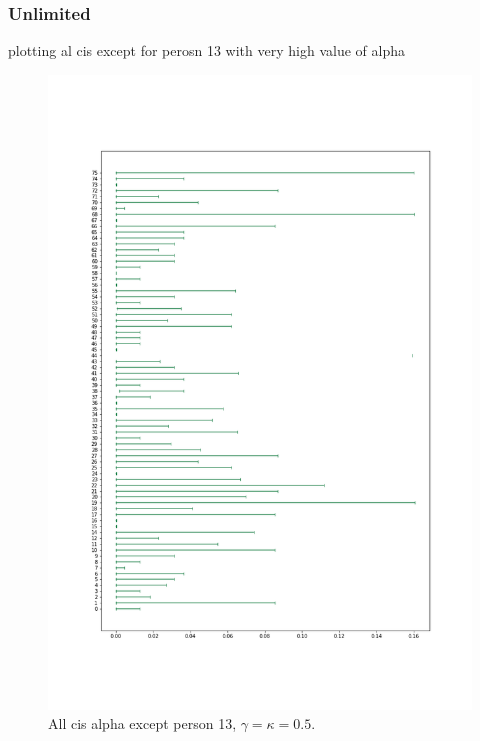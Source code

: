 \subsubsection{Unlimited}
plotting al cis except for perosn 13 with very high value of alpha
\begin{figure}
    \centering
    \includegraphics[scale=0.37]{pictures/Gamma=kappa=0.5/all_cis_alpha_unlim.png}
    \caption{All cis alpha except person 13, $\gamma=\kappa=0.5$.}
    \label{fig:gk0.5_all_cis_alpha_unlim}
\end{figure}

